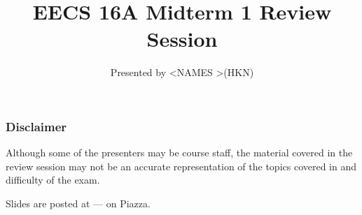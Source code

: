\documentclass{beamer}
\title{EECS 16A Midterm 1 Review Session}
\author{Presented by \textless NAMES \textgreater (HKN)}
\date{}
\begin{document}
\begin{frame}

\titlepage

\end{frame}

\begin{frame}[t]\vspace{20pt}
\frametitle{Disclaimer}
Although some of the presenters may be course staff, the material covered in the review session may not be an accurate representation of the topics covered in and difficulty of the exam.

\vspace{20pt}
Slides are posted at --- on Piazza.

\end{frame}
\end{document}
